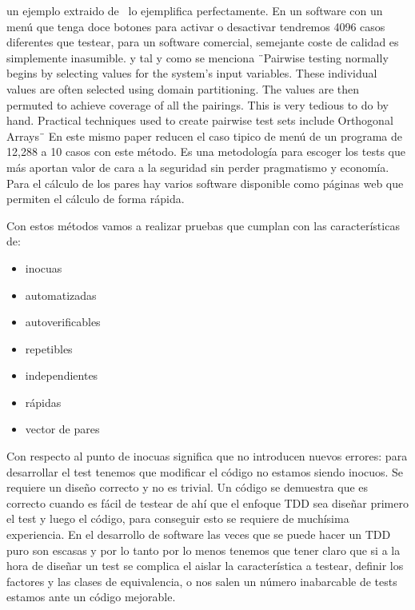 un ejemplo extraido de~\cite{Bach04pairwisetesting} lo ejemplifica perfectamente. En un software con un menú que tenga doce botones para activar o desactivar tendremos 4096 casos diferentes que testear, para un software comercial, semejante coste de calidad es simplemente inasumible. y tal y como se menciona ¨Pairwise testing normally begins by selecting values for the system’s input variables. These individual values are often selected using domain partitioning. The values are then permuted to achieve coverage of all the pairings. This is very tedious to do by hand. Practical techniques used to create pairwise test sets include Orthogonal Arrays¨\cite{Bach04pairwisetesting} En este mismo paper reducen el caso tipico de menú de un programa de 12,288 a 10 casos con este método. Es una metodología para escoger los tests que más aportan valor de cara a la seguridad sin perder pragmatismo y economía. Para el cálculo de los pares hay varios software disponible como páginas web que permiten el cálculo de forma rápida.

Con estos métodos vamos a realizar pruebas que cumplan con las características de:

\begin{itemize}
    \item inocuas
    \item automatizadas
    \item autoverificables
    \item repetibles
    \item independientes
    \item rápidas
    \item vector de pares
\end{itemize}

Con respecto al punto de inocuas significa que no introducen nuevos errores: para desarrollar el test tenemos que modificar el código no estamos siendo inocuos. Se requiere un diseño correcto y no es trivial. Un código se demuestra que es correcto cuando es fácil de testear de ahí que el enfoque TDD sea diseñar primero el test y luego el código, para conseguir esto se requiere de muchísima experiencia. En el desarrollo de software las veces que se puede hacer un TDD puro son escasas y por lo tanto por lo menos tenemos que tener claro que si a la hora de diseñar un test se complica el aislar la característica a testear, definir los factores y las clases de equivalencia, o nos salen un número inabarcable de tests estamos ante un código mejorable.